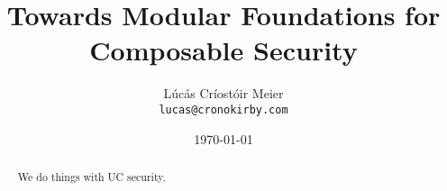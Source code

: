 

\date{\today}
\title{Towards Modular Foundations for Composable Security}
\author{Lúcás Críostóir Meier\\\texttt{lucas@cronokirby.com}}



\maketitle

\begin{abstract}
    We do things with UC security.
\end{abstract}











{\small }
\clearpage
\appendix


